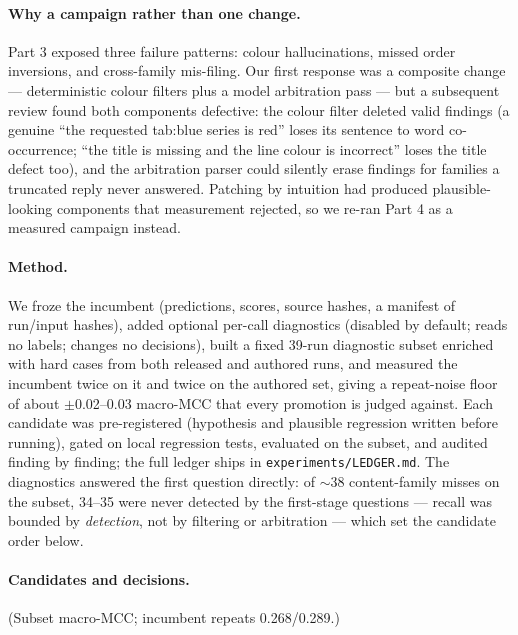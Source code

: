 \documentclass[11pt]{article}
\begin{document}
\paragraph{Why a campaign rather than one change.} Part 3 exposed three
failure patterns: colour hallucinations, missed order inversions, and
cross-family mis-filing. Our first response was a composite change ---
deterministic colour filters plus a model arbitration pass --- but a
subsequent review found both components defective: the colour filter
deleted valid findings (a genuine ``the requested tab:blue series is
red'' loses its sentence to word co-occurrence; ``the title is missing
and the line colour is incorrect'' loses the title defect too), and the
arbitration parser could silently erase findings for families a
truncated reply never answered. Patching by intuition had produced
plausible-looking components that measurement rejected, so we re-ran
Part 4 as a measured campaign instead.

\paragraph{Method.} We froze the incumbent (predictions, scores, source
hashes, a manifest of run/input hashes), added optional per-call
diagnostics (disabled by default; reads no labels; changes no
decisions), built a fixed 39-run diagnostic subset enriched with hard
cases from both released and authored runs, and measured the incumbent
twice on it and twice on the authored set, giving a repeat-noise floor
of about $\pm$0.02--0.03 macro-MCC that every promotion is judged
against. Each candidate was pre-registered (hypothesis and plausible
regression written before running), gated on local regression tests,
evaluated on the subset, and audited finding by finding; the full ledger
ships in \texttt{experiments/LEDGER.md}. The diagnostics answered the
first question directly: of $\sim$38 content-family misses on the
subset, 34--35 were never detected by the first-stage questions ---
recall was bounded by \emph{detection}, not by filtering or arbitration
--- which set the candidate order below.

\paragraph{Candidates and decisions.} (Subset macro-MCC; incumbent
repeats 0.268/0.289.)
\end{document}
